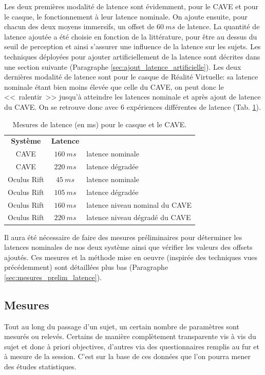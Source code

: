 	\par Les deux premières modalité de latence sont évidemment, pour le CAVE et pour le casque, le fonctionnement à leur latence nominale. On ajoute ensuite, pour chacun des deux moyens immersifs, un offset de $60~ms$ de latence. La quantité de latence ajoutée a été choisie en fonction de la littérature, pour être au dessus du seuil de perception et ainsi s'assurer une influence de la latence sur les sujets. Les techniques déployées pour ajouter artificiellement de la latence sont décrites dans une section suivante (Paragraphe \ref{sec:ajout_latence_artificielle}). Les deux dernières modalité de latence sont pour le casque de Réalité Virtuelle: sa latence nominale étant bien moins élevée que celle du CAVE, on peut donc le <<~ralentir~>> jusqu'à atteindre les latences nominale et après ajout de latence du CAVE. On se retrouve donc avec 6 expériences différentes de latence (Tab. \ref{tab:latence_casque_cave_expe}).
	
	\begin{table}[h]	
		\centering
		\caption{Mesures de latence (en ms) pour le casque et le CAVE.}
		\label{tab:latence_casque_cave_expe}
		\begin{tabular}{c|c|l}
			\textbf{Système} & \textbf{Latence}\\
			CAVE & $160~ms$ & latence nominale\\
			CAVE & $220~ms$ & latence dégradée\\
			Oculus Rift & $45~ms$ & latence nominale\\
			Oculus Rift & $105~ms$ & latence dégradée\\
			Oculus Rift & $160~ms$ & latence niveau nominal du CAVE\\
			Oculus Rift & $220~ms$ & latence niveau dégradé du CAVE\\
		\end{tabular}
	\end{table}
	
	\par Il aura été nécessaire de faire des mesures préliminaires pour déterminer les latences nominales de nos deux système ainsi que vérifier les valeurs des offsets ajoutés. Ces mesures et la méthode mise en oeuvre (inspirée des techniques vues précédemment) sont détaillées plus bas (Paragraphe \ref{sec:mesures_prelim_latence}).
	
	\subsection{Mesures}
	\par Tout au long du passage d'un sujet, un certain nombre de paramètres sont mesurés ou relevés. Certains de manière complètement transparente vis à vis du sujet et donc à priori objectives, d'autres via des questionnaires remplis au fur et à mesure de la session. C'est sur la base de ces données que l'on pourra mener des études statistiques.
	
